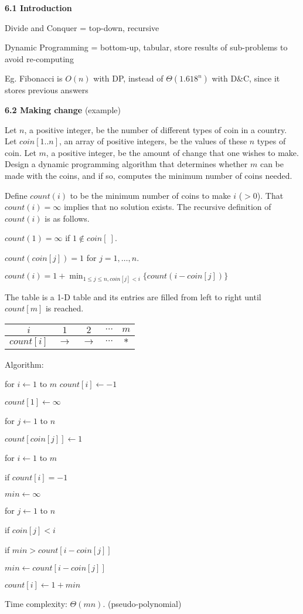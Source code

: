 
    \textbf{6.1 Introduction}

Divide and Conquer = top-down, recursive

Dynamic Programming = bottom-up, tabular,
store results of sub-problems to avoid re-computing

Eg. Fibonacci is $O(n)$ with DP, instead of $\Theta(1.618^n)$ with D\&C, since it stores previous answers

    \textbf{6.2 Making change} (example)

Let $n$, a positive integer, be the number of different
types of coin in a country. Let $coin[1..n]$, an array of
positive integers, be the values of these $n$ types of coin. Let
$m$, a positive integer, be the amount of change that one wishes to make.
Design a dynamic programming algorithm that determines whether $m$
can be made with the coins, and if so, computes the minimum number of coins
needed.

Define $count(i)$ to be the minimum number of coins to
make $i$ ($>0$). That $count(i)=\infty$ implies that no solution
exists. The recursive definition of $count(i)$ is as follows.

$count(1)=\infty$ if $1\not\in coin[\ ]$.

$count(coin[j])=1$ for $j=1,\ldots,n$.

$count(i)=1+\min_{1\le j\le n,coin[j]<i}\{count(i-coin[j])\}$

\item The table is a 1-D table and its entries are filled from left
to right until $count[m]$ is reached.

\begin{center}
\begin{tabular}{c|c|c|c|c}
$i$ & $1$ & $2$ & $\cdots$ & $m$\\\hline
$count[i]$ & $\rightarrow$ & $\rightarrow$ & $\cdots$ & $*$\\
\end{tabular}
\end{center}

Algorithm:

\qquad for $i\leftarrow 1$ to $m$ $count[i]\leftarrow -1$

\qquad $count[1]\leftarrow\infty$

\qquad for $j\leftarrow 1$ to $n$

\qquad\qquad $count[coin[j]]\leftarrow 1$

\qquad for $i\leftarrow 1$ to $m$

\qquad\qquad if $count[i]=-1$

\qquad\qquad\qquad $min\leftarrow\infty$

\qquad\qquad\qquad for $j\leftarrow 1$ to $n$

\qquad\qquad\qquad\qquad if $coin[j]<i$ 
              
\qquad\qquad\qquad\qquad\qquad if $min>count[i-coin[j]]$

\qquad\qquad\qquad\qquad\qquad\qquad $min\leftarrow count[i-coin[j]]$

\qquad\qquad\qquad $count[i]\leftarrow 1+min$
 
Time complexity: $\Theta(mn)$. (pseudo-polynomial)


